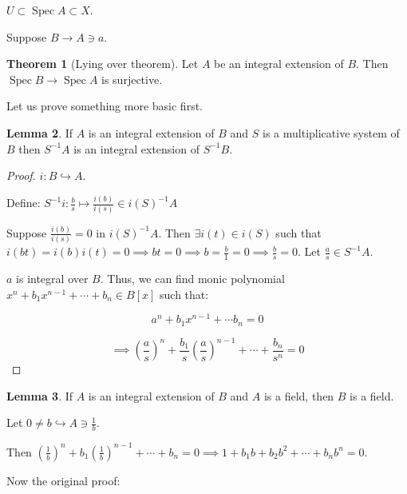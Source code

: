 \documentclass{article}
\theoremstyle{definition}
\newtheorem{theorem}{Theorem}
\newtheorem{lemma}[theorem]{Lemma}
\begin{document}
    \(U \subset \operatorname{Spec} A \subset X\).

    Suppose \(B \to A \ni a\).

    \begin{theorem}
        [Lying over theorem]

        Let \(A\) be an integral extension of \(B\). Then \(\operatorname{Spec} B \to \operatorname{Spec} A\) is surjective.
    \end{theorem}

    Let us prove something more basic first.

    \begin{lemma}
        If \(A\) is an integral extension of \(B\) and \(S\) is a multiplicative system of \(B\) then \(S ^{-1} A\) is an integral extension of \(S ^{-1} B\).
    \end{lemma}

    \begin{proof}
        \(i: B \hookrightarrow A\).
        
        Define: \(S^{-1} i: \frac{b}{s} \mapsto \frac{i(b)}{i(s)} \in i(S) ^{-1} A\)  

        Suppose \(\frac{i(b)}{i(s)} = 0\) in \(i(S) ^{-1} A\). Then \(\exists i(t) \in i(S)\) such that \(i(bt) = i(b) i(t) = 0 \implies bt = 0 \implies b = \frac{b}{1} = 0 \implies \frac{b}{s}= 0\).  
        Let \(\frac{a}{s} \in S ^{-1} A\).
        
        \(a\) is integral over \(B\). Thus, we can find monic polynomial \(x^n + b_1 x^{n-1} + \cdots + b_n \in B[x]\) such that:

        \[
            a^n + b_1 x^{n-1} + \cdots b_n = 0
        \]

        \[
            \implies \left( \frac{a}{s} \right) ^ n + \frac{b_1}{s} \left( \frac{a}{s} \right) ^{n-1} + \cdots + \frac{b_n}{s^n} = 0
        \]
    \end{proof}

    \begin{lemma}
        If \(A\) is an integral extension of \(B\) and \(A\) is a field, then \(B\) is a field.
    \end{lemma}

    Let \(0 \neq b \hookrightarrow A \ni \frac{1}{b}\).
    
    Then \(\left( \frac{1}{b} \right)^n + b_1 \left( \frac{1}{b} \right)^{n-1} + \cdots + b_n = 0 \implies 1 + b_1 b + b_2 b^2 + \cdots + b_n b^n = 0\).

    Now the original proof:
\end{document}
